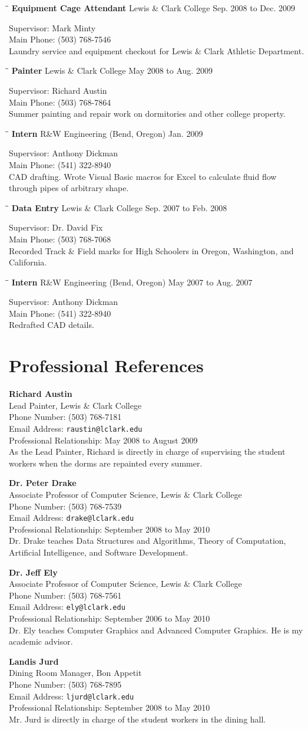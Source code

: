 \documentclass{res}
\newcommand{\employment}[6]{\vspace{-0.1in}\begin{tabbing}\hspace{2.3in}\= \hspace{2.6in}\= \kill
    \textbf{#1} \>#2     \>#3\\
                             \end{tabbing}\vspace{-20pt}
                             Supervisor: #4\\
                            Main Phone: #5\\
                             #6}
\newcommand{\reference}[6]{\textbf{#1}\\#2\\Phone Number: #3\\Email Address:
\texttt{#4}\\Professional Relationship: #5\\#6}
\begin{document}
\begin{resume}
    \employment{Equipment Cage Attendant}{Lewis \& Clark College}{Sep. 2008
    to Dec. 2009}{Mark Minty}{(503) 768-7546}{Laundry service and equipment
    checkout for Lewis \& Clark Athletic Department.}

    \employment{Painter}{Lewis \& Clark College}{May 2008 to Aug.
    2009}{Richard Austin}{(503) 768-7864}{Summer painting and repair work on
    dormitories and other college property.}

    \employment{Intern}{R\&W Engineering (Bend, Oregon)}{Jan. 2009}{Anthony
    Dickman}{(541) 322-8940}{CAD drafting.  Wrote Visual Basic macros for Excel to calculate
    fluid flow through pipes of arbitrary shape.}

    \employment{Data Entry}{Lewis \& Clark College}{Sep. 2007 to Feb.
    2008}{Dr. David Fix}{(503) 768-7068}{Recorded Track \& Field marks for High
    Schoolers in Oregon, Washington, and California.}

    \employment{Intern}{R\&W Engineering (Bend, Oregon)}{May 2007 to Aug. 2007}{Anthony
    Dickman}{(541) 322-8940}{Redrafted CAD details.}

\section{Professional References}
    \reference{Richard Austin}
    {Lead Painter, Lewis \& Clark College}
    {(503) 768-7181}
    {raustin@lclark.edu}
    {May 2008 to August 2009}
    {As the Lead Painter, Richard is directly in charge of supervising the
    student workers when the dorms are repainted every summer.}

    \reference{Dr. Peter Drake}
    {Associate Professor of Computer Science, Lewis \& Clark College}
    {(503) 768-7539}
    {drake@lclark.edu}
    {September 2008 to May 2010}
    {Dr. Drake teaches Data Structures and Algorithms, Theory of Computation,
    Artificial Intelligence, and Software Development.}
 
    \reference{Dr. Jeff Ely}
    {Associate Professor of Computer Science, Lewis \& Clark College}
    {(503) 768-7561}
    {ely@lclark.edu}
    {September 2006 to May 2010}
    {Dr. Ely teaches Computer Graphics and Advanced Computer Graphics.  He is my
    academic advisor.}

    \reference{Landis Jurd}
    {Dining Room Manager, Bon Appetit}
    {(503) 768-7895}
    {ljurd@lclark.edu}
    {September 2008 to May 2010}
    {Mr. Jurd is directly in charge of the student workers in the dining hall.}


\end{resume}
\end{document}
